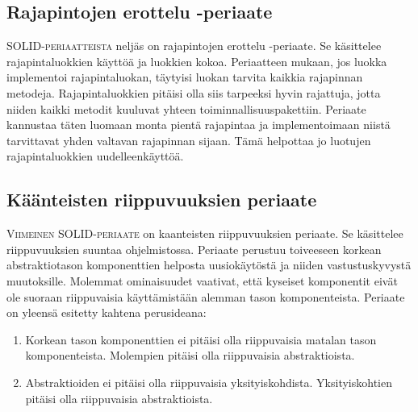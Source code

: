 \documentclass[openany]{book}
\newcommand{\newthought}[1]{\smallskip\textsc{#1}}
\begin{document}
\subsection{Rajapintojen erottelu -periaate}
\label{ISP}

\newthought{SOLID-periaatteista} neljäs on \gls{rajapintojen erottelu -periaate}. Se käsittelee
rajapintaluokkien käyttöä ja luokkien kokoa. Periaatteen mukaan, jos luokka implementoi
rajapintaluokan, täytyisi luokan tarvita kaikkia rajapinnan metodeja. Rajapintaluokkien pitäisi
olla siis tarpeeksi hyvin rajattuja, jotta niiden kaikki metodit kuuluvat yhteen
toiminnallisuuspakettiin. Periaate kannustaa täten luomaan monta pientä rajapintaa ja
implementoimaan niistä tarvittavat yhden valtavan rajapinnan sijaan. Tämä helpottaa jo luotujen
rajapintaluokkien uudelleenkäyttöä.

\subsection{Käänteisten riippuvuuksien periaate}
\label{DIP}

\newthought{Viimeinen SOLID-periaate} on \gls{kaanteisten riippuvuuksien periaate}. Se
käsittelee riippuvuuksien suuntaa ohjelmistossa. Periaate perustuu toiveeseen korkean
abstraktiotason komponenttien helposta uusiokäytöstä ja niiden vastustuskyvystä muutoksille.
Molemmat ominaisuudet vaativat, että kyseiset komponentit eivät ole suoraan riippuvaisia
käyttämistään alemman tason komponenteista. Periaate on yleensä esitetty kahtena perusideana:

\begin{enumerate}
	\item Korkean tason komponenttien ei pitäisi olla riippuvaisia matalan tason komponenteista. Molempien pitäisi olla riippuvaisia abstraktioista.
	\item Abstraktioiden ei pitäisi olla riippuvaisia yksityiskohdista. Yksityiskohtien pitäisi olla riippuvaisia abstraktioista.
\end{enumerate}
\end{document}
